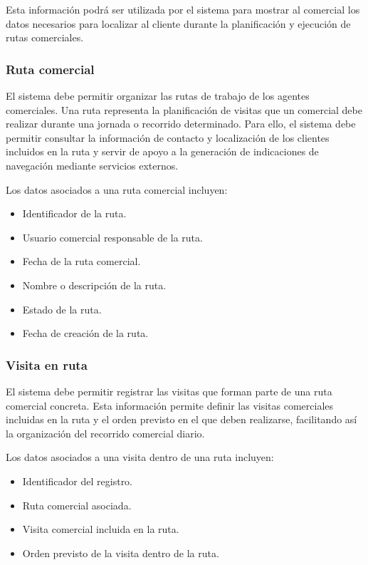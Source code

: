 Esta información podrá ser utilizada por el sistema para mostrar al comercial los datos necesarios para localizar al cliente durante la planificación y ejecución de rutas comerciales.

\subsubsection*{Ruta comercial}

El sistema debe permitir organizar las rutas de trabajo de los agentes comerciales. Una ruta representa la planificación de visitas que un comercial debe realizar durante una jornada o recorrido determinado. Para ello, el sistema debe permitir consultar la información de contacto y localización de los clientes incluidos en la ruta y servir de apoyo a la generación de indicaciones de navegación mediante servicios externos.

Los datos asociados a una ruta comercial incluyen:

\begin{itemize}
    \item Identificador de la ruta.
    \item Usuario comercial responsable de la ruta.
    \item Fecha de la ruta comercial.
    \item Nombre o descripción de la ruta.
    \item Estado de la ruta.
    \item Fecha de creación de la ruta.
\end{itemize}

\subsubsection*{Visita en ruta}

El sistema debe permitir registrar las visitas que forman parte de una ruta comercial concreta. Esta información permite definir las visitas comerciales incluidas en la ruta y el orden previsto en el que deben realizarse, facilitando así la organización del recorrido comercial diario.

Los datos asociados a una visita dentro de una ruta incluyen:

\begin{itemize}
    \item Identificador del registro.
    \item Ruta comercial asociada.
    \item Visita comercial incluida en la ruta.
    \item Orden previsto de la visita dentro de la ruta.
\end{itemize}


